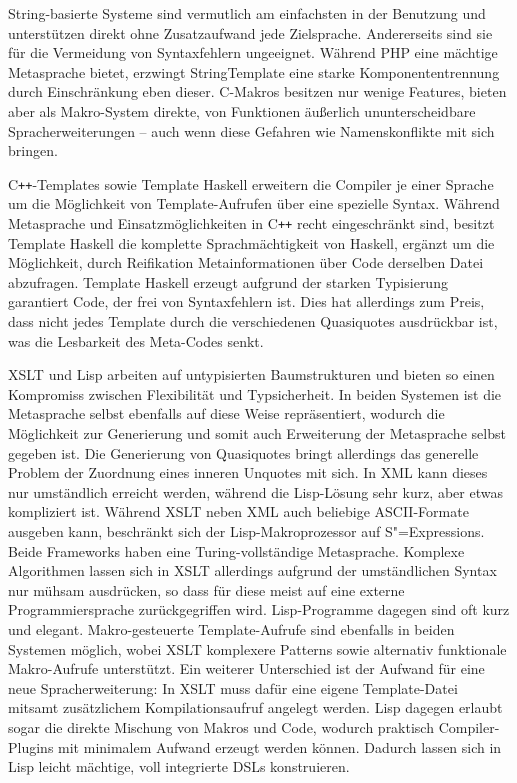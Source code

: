 \documentclass[12pt, a4paper, bibgerm]{scrbook}
\newcommand{\sexps}{S"=Expressions}
\newcommand{\cpp}{C\texttt{++}}
\begin{document}
String-basierte Systeme sind vermutlich am einfachsten in der Benutzung
und unterstützen direkt ohne Zusatzaufwand jede
Zielsprache. Andererseits sind sie für die Vermeidung von Syntaxfehlern
ungeeignet. Während PHP eine mächtige Metasprache bietet, erzwingt
StringTemplate eine starke Komponententrennung durch Einschränkung eben
dieser. C-Makros besitzen nur wenige Features, bieten aber als
Makro-System direkte, von Funktionen äußerlich ununterscheidbare
Spracherweiterungen -- auch wenn diese Gefahren wie Namenskonflikte mit
sich bringen.

\cpp{}-Templates sowie Template Haskell erweitern die Compiler je einer
Sprache um die Möglichkeit von Template-Aufrufen über eine spezielle
Syntax. Während Metasprache und Einsatzmöglichkeiten in \cpp{} recht
eingeschränkt sind, besitzt Template Haskell die komplette
Sprachmächtigkeit von Haskell, ergänzt um die Möglichkeit, durch
Reifikation Metainformationen über Code derselben Datei
abzufragen. Template Haskell erzeugt aufgrund der starken Typisierung
garantiert Code, der frei von Syntaxfehlern ist. Dies hat allerdings
zum Preis, dass nicht jedes Template durch die verschiedenen Quasiquotes
ausdrückbar ist, was die Lesbarkeit des Meta-Codes senkt.

XSLT und Lisp arbeiten auf untypisierten Baumstrukturen und bieten so
einen Kompromiss zwischen Flexibilität und Typsicherheit. In beiden
Systemen ist die Metasprache selbst ebenfalls auf diese Weise
repräsentiert, wodurch die Möglichkeit zur Generierung und somit auch
Erweiterung der Metasprache selbst gegeben ist. Die Generierung von
Quasiquotes bringt allerdings das generelle Problem der Zuordnung eines
inneren Unquotes mit sich. In XML kann dieses nur umständlich erreicht
werden, während die Lisp-Lösung sehr kurz, aber etwas kompliziert
ist. Während XSLT neben XML auch beliebige ASCII-Formate ausgeben kann,
beschränkt sich der Lisp-Makroprozessor auf \sexps{}. Beide Frameworks
haben eine Turing-vollständige Metasprache. Komplexe Algorithmen lassen
sich in XSLT allerdings aufgrund der umständlichen Syntax nur mühsam
ausdrücken, so dass für diese meist auf eine externe Programmiersprache
zurückgegriffen wird. Lisp-Programme dagegen sind oft kurz und
elegant. Makro-gesteuerte Template-Aufrufe sind ebenfalls in beiden
Systemen möglich, wobei XSLT komplexere Patterns sowie alternativ
funktionale Makro-Aufrufe unterstützt. Ein weiterer Unterschied ist der
Aufwand für eine neue Spracherweiterung: In XSLT muss dafür eine eigene
Template-Datei mitsamt zusätzlichem Kompilationsaufruf angelegt
werden. Lisp dagegen erlaubt sogar die direkte Mischung von Makros und
Code, wodurch praktisch Compiler-Plugins mit minimalem Aufwand erzeugt
werden können. Dadurch lassen sich in Lisp leicht mächtige, voll
integrierte DSLs konstruieren.
\end{document}
